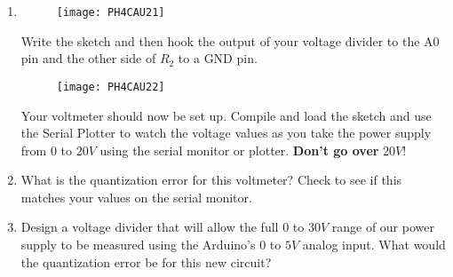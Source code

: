 \begin{enumerate}
\begin{enumerate}
			\item 
				\begin{figure}[h!]
					\centering
					\texttt{[image: PH4CAU21]}
				\end{figure}

				Write the sketch and then hook the output of your voltage divider to the A0 pin and the other side of $R_{2} $ to a GND pin.
				\begin{figure}[h!]
					\centering
					\texttt{[image: PH4CAU22]}
				\end{figure}

				Your voltmeter should now be set up. Compile and load the sketch and use the Serial Plotter to watch the voltage values as you take the power supply from $0$ to $20\unit{V}$ using the serial monitor or plotter. \textbf{Don't go over }$20\unit{V}!$

				\item What is the quantization error for this voltmeter? Check to see if this matches your values on the serial monitor.

				\item Design a voltage divider that will allow the full $0$ to $30\unit{V}$ range of our power supply to be measured using the Arduino's $0$ to $5\unit{V}$ analog input. What would the quantization error be for this new circuit?
		\end{enumerate}
\end{enumerate}